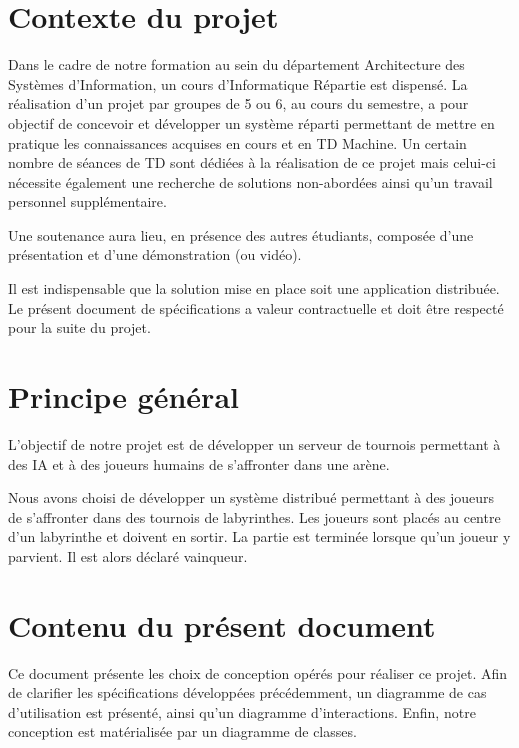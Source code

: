 \section*{Contexte du projet}
    Dans le cadre de notre formation au sein du département Architecture des Systèmes d'Information, un cours d'Informatique Répartie est dispensé. La réalisation d'un projet par groupes de 5 ou 6, au cours du semestre, a pour objectif de concevoir et développer un système réparti permettant de mettre en pratique les connaissances acquises en cours et en TD Machine. Un certain nombre de séances de TD sont dédiées à la réalisation de ce projet mais celui-ci nécessite également une recherche de solutions non-abordées ainsi qu'un travail personnel supplémentaire.

    Une soutenance aura lieu, en présence des autres étudiants, composée d'une présentation et d'une démonstration (ou vidéo).

    Il est indispensable que la solution mise en place soit une application distribuée. Le présent document de spécifications a valeur contractuelle et doit être respecté pour la suite du projet.


\section*{Principe général}
    L'objectif de notre projet est de développer un serveur de tournois permettant à des IA et à des joueurs humains de s'affronter dans une arène.

    Nous avons choisi de développer un système distribué permettant à des joueurs de s'affronter dans des tournois de labyrinthes. Les joueurs sont placés au centre d'un labyrinthe et doivent en sortir. La partie est terminée lorsque qu'un joueur y parvient. Il est alors déclaré vainqueur.


\section*{Contenu du présent document}
	Ce document présente les choix de conception opérés pour réaliser ce projet. Afin de clarifier les spécifications développées précédemment, un diagramme de cas d'utilisation est présenté, ainsi qu'un diagramme d'interactions. Enfin, notre conception est matérialisée par un diagramme de classes.
